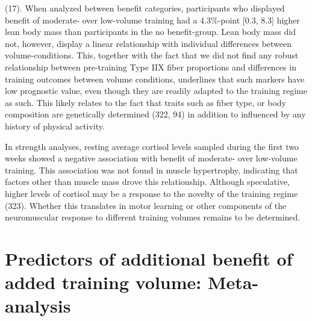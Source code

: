 \documentclass[twoside,10pt]{gihclass} %
\begin{document}
(17).
When analyzed between benefit categories, participants who displayed benefit of moderate- over low-volume training had a 4.3\%-point {[}0.3, 8.3{]} higher lean body mass than participants in the no benefit-group.
Lean body mass did not, however, display a linear relationship with individual differences between volume-conditions.
This, together with the fact that we did not find any robust relationship between pre-training Type IIX fiber proportions and differences in training outcomes between volume conditions, underlines that such markers have low prognostic value, even though they are readily adapted to the training regime as such.
This likely relates to the fact that traits such as fiber type, or body composition are genetically determined
(322, 94)
in addition to influenced by any history of physical activity.

In strength analyses, resting average cortisol levels sampled during the first two weeks showed a negative association with benefit of moderate- over low-volume training. This association was not found in muscle hypertrophy, indicating that factors other than muscle mass drove this relationship. Although speculative, higher levels of cortisol may be a response to the novelty of the training regime
(323).
Whether this translates in motor learning or other components of the neuromuscular response to different training volumes remains to be determined.

\hypertarget{predictors-of-additional-benefit-of-added-training-volume-meta-analysis}{%
\section{Predictors of additional benefit of added training volume: Meta-analysis}\label{predictors-of-additional-benefit-of-added-training-volume-meta-analysis}}
\end{document}
